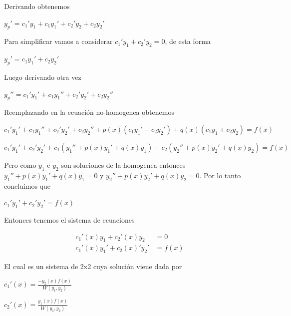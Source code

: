 \documentclass{article}
\theoremstyle{plain}
\theoremstyle{definition}
\begin{document}
Derivando obtenemos



\begin{center}
$y_p'= c_1'y_1+ c_1y_1'+c_2'y_2 +c_2y_2'$
\end{center}

Para simplificar  vamos a considerar $c_1'y_1+c_2'y_2=0$, de esta forma

\begin{center}
$y_p'=  c_1y_1'+c_2y_2'$
\end{center}


Luego derivando otra vez


\begin{center}
$y_p''=  c_1' y_1'+ c_1y_1''+ c_2'y_2' + c_2y_2''$
\end{center}


Reemplazando en la ecuación no-homogenea obtenemos



\begin{center}
$c_1' y_1'+ c_1y_1''+ c_2'y_2' + c_2y_2''+p(x)(c_1y_1'+c_2y_2')+q(x)(c_1y_1+c_2y_2)=f(x)$
\end{center}


\begin{center}
$c_1' y_1'+ c_2'y_2' + c_1(y_1'' + p(x)y_1' +q(x)y_1) + c_2(y_2'' + p(x)y_2' +q(x)y_2)=f(x)$
\end{center}

Pero como $y_1$ e $y_2$ son soluciones de la homogenea entonces $y_1'' + p(x)y_1' +q(x)y_1 = 0$ y $y_2'' + p(x)y_2' +q(x)y_2 =0$. Por lo tanto concluimos que


\begin{center}
$c_1' y_1'+ c_2'y_2'=f(x)$
\end{center}

Entonces tenemos el sistema de ecuaciones


\begin{align*}
c_1'(x)y_1+c_2'(x)y_2&=0 \\
c_1'(x) y_1'+ c_2(x)'y_2'&=f(x)
\end{align*}

El cual es un sistema de 2x2 cuya solución viene dada por

\begin{center}
$\displaystyle c_1'(x) = 	\frac{-y_2(x)f(x)}{W(y_1,y_2)}$
\end{center}

\begin{center}
$\displaystyle c_2'(x) = 	\frac{y_1(x)f(x)}{W(y_1,y_2)}$
\end{center}
\end{document}
